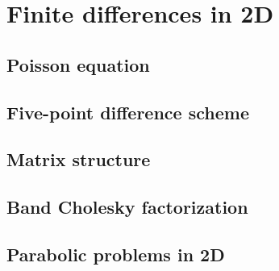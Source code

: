 \chapter{Finite differences in 2D}

\section{Poisson equation}

\section{Five-point difference scheme}

\section{Matrix structure}

\section{Band Cholesky factorization}

\section{Parabolic problems in 2D}
